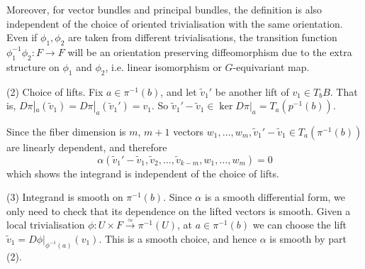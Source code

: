 Moreover, for vector bundles and principal bundles, the definition is also 
independent of the choice of oriented trivialisation with the same orientation. 
Even if $\phi_1,\phi_2$ are taken from different trivialisations, the
transition function $\phi_1^{-1}\phi_2: F \to F$ will be an orientation
preserving diffeomorphism due to the extra structure on $\phi_1$ and
$\phi_2$, i.e. linear isomorphism or $G$-equivariant map. 

(2) Choice of lifts. Fix $a\in \pi^{-1}(b)$, and let $\widetilde{v}_1'$ be 
another lift of $v_1\in T_bB$. That is, 
$D\pi|_a(\widetilde{v}_1)=D\pi|_a(\widetilde{v}_1')=v_1$. So
$\widetilde{v}_1'-\widetilde{v}_1\in \ker D\pi|_a = T_a(p^{-1}(b))$.  

Since the fiber dimension is $m$, $m+1$ vectors 
$w_1,\ldots,w_m,\widetilde{v}_1'-\widetilde{v}_1 \in T_a(\pi^{-1}(b))$ are
linearly dependent, and therefore 
\[
\alpha(\widetilde{v}_1'-\widetilde{v}_1,
\widetilde{v}_2,\ldots,\widetilde{v}_{k-m},w_1,\ldots,w_m) = 0
\] 
which shows the integrand is independent of the choice of lifts.

(3) Integrand is smooth on $\pi^{-1}(b)$. Since $\alpha$ is a smooth 
differential form, we only need to check that its dependence on the lifted 
vectors is smooth. Given a local trivialisation $\phi : U\times F
\xrightarrow{\simeq} \pi^{-1}(U)$, at $a\in\pi^{-1}(b)$ we can choose the lift 
$\widetilde{v}_1 = D\phi|_{\phi^{-1}(a)}(v_1)$. This is a smooth choice, and
hence $\alpha$ is smooth by part (2). 

